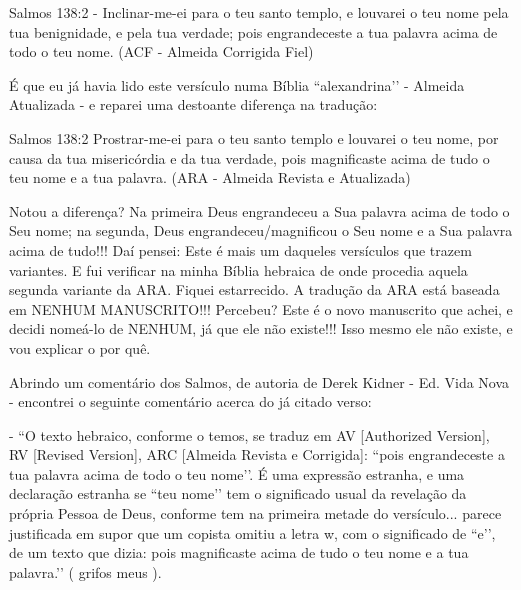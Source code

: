 Salmos 138:2 - Inclinar-me-ei para o teu santo templo, e louvarei o teu nome pela tua benignidade, e pela tua verdade; pois engrandeceste a tua palavra acima de todo o teu nome. (ACF - Almeida Corrigida Fiel)

É que eu já havia lido este versículo numa Bíblia ``alexandrina’’ - Almeida Atualizada - e reparei uma destoante diferença na tradução:

Salmos 138:2 Prostrar-me-ei para o teu santo templo e louvarei o teu nome, por causa da tua misericórdia e da tua verdade, pois magnificaste acima de tudo o teu nome e a tua palavra. (ARA - Almeida Revista e Atualizada)

Notou a diferença? Na primeira Deus engrandeceu a Sua palavra acima de todo o Seu nome; na segunda, Deus engrandeceu/magnificou o Seu nome e a Sua palavra acima de tudo!!! Daí pensei: Este é mais um daqueles versículos que trazem variantes. E fui verificar na minha Bíblia hebraica de onde procedia aquela segunda variante da ARA. Fiquei estarrecido. A tradução da ARA está baseada em NENHUM MANUSCRITO!!! Percebeu? Este é o novo manuscrito que achei, e decidi nomeá-lo de NENHUM, já que ele não existe!!! Isso mesmo ele não existe, e vou explicar o por quê.

Abrindo um comentário dos Salmos, de autoria de Derek Kidner - Ed. Vida Nova - encontrei o seguinte comentário acerca do já citado verso:

- ``O texto hebraico, conforme o temos, se traduz em AV [Authorized Version], RV [Revised Version], ARC [Almeida Revista e Corrigida]: ``pois engrandeceste a tua palavra acima de todo o teu nome’’. É uma expressão estranha, e uma declaração estranha se ``teu nome’’ tem o significado usual da revelação da própria Pessoa de Deus, conforme tem na primeira metade do versículo... parece justificada em supor que um copista omitiu a letra w, com o significado de ``e’’, de um texto que dizia: pois magnificaste acima de tudo o teu nome e a tua palavra.’’ ( grifos meus ).



